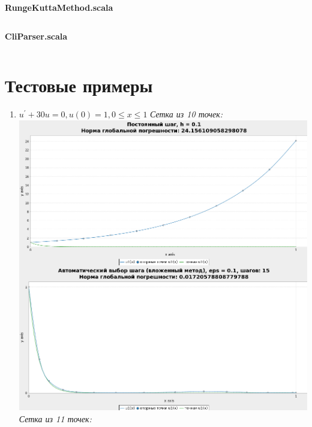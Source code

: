 \documentclass[a4paper,12pt]{article}
\begin{document}
\textbf{RungeKuttaMethod.scala}
\inputminted[breaklines]{scala}{../src/main/scala/RungeKuttaMethod.scala}

\textbf{CliParser.scala}
\inputminted[breaklines]{scala}{../src/main/scala/CliParser.scala}

\section{\normalsize{Тестовые примеры}}
\begin{flushleft}
  \begin{enumerate}
    \item 
      \(u^{'} + 30u = 0, u(0) = 1, 0 \le x \le 1\)\linebreak\linebreak
      \textit{Сетка из 10 точек:}\linebreak
      \includegraphics[scale=0.325]{10_segments.png}\linebreak
      \textit{Сетка из 11 точек:}\linebreak\linebreak

\end{enumerate}
\end{flushleft}
\end{document}
